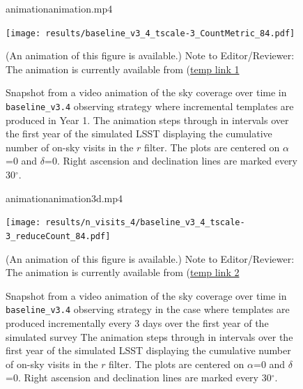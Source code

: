 \documentclass[preprint,linenumbers]{aastex631}
\newcommand{\baseline}{\texttt{baseline\_v3.4}\xspace}
\begin{document}
{		\begin{figure}
			\begin{center}
				\begin{interactive}{animation}{animation.mp4}
				\end{interactive}
				\texttt{[image: results/baseline\_v3\_4\_tscale-3\_CountMetric\_84.pdf]}
				\caption{Snapshot from a video animation of the sky coverage over time in \baseline observing strategy where incremental templates are produced in Year 1.  The animation steps through in intervals over the first year of the simulated LSST displaying the cumulative number of on-sky visits in the $r$ filter. The plots are centered on $\alpha$=0 and $\delta$=0. Right ascension and declination lines are marked every 30$^\circ$.} (An animation of this figure is available.)  Note to Editor/Reviewer: The animation is currently available from (\href{https://uoe-my.sharepoint.com/:v:/g/personal/jrobin10_ed_ac_uk/Ef0X-FVuKAhNtJtvRQiyPDMBi-5ypVqPowcvGSMqsr9PZw?nav=eyJyZWZlcnJhbEluZm8iOnsicmVmZXJyYWxBcHAiOiJPbmVEcml2ZUZvckJ1c2luZXNzIiwicmVmZXJyYWxBcHBQbGF0Zm9ybSI6IldlYiIsInJlZmVycmFsTW9kZSI6InZpZXciLCJyZWZlcnJhbFZpZXciOiJNeUZpbGVzTGlua0NvcHkifX0&e=ysWV8t}{temp link 1} \label{animation:baseline}
			\end{center}
		\end{figure}
		
		\begin{figure}
			\begin{center}
				\begin{interactive}{animation}{animation3d.mp4}
				\end{interactive}
				\texttt{[image: results/n\_visits\_4/baseline\_v3\_4\_tscale-3\_reduceCount\_84.pdf]}
				\caption{Snapshot from a video animation of the sky coverage over time in \baseline observing strategy in the case where templates are produced incrementally every 3 days over the first year of the simulated survey  The animation steps through in intervals over the first year of the simulated LSST displaying the cumulative number of on-sky visits in the $r$ filter. The plots are centered on $\alpha$=0 and $\delta$=0. Right ascension and declination lines are marked every 30$^\circ$.} (An animation of this figure is available.) Note to Editor/Reviewer: The animation is currently available from (\href{https://uoe-my.sharepoint.com/:i:/g/personal/jrobin10_ed_ac_uk/EUN-c34vnEhGqAQQM5mUa6IBH9gxRnU3ufP9h5sCSHjz2w?e=O73p7P}{temp link 2} \label{animation:3dsays}
			\end{center}
		\end{figure}
		
}
\end{document}
